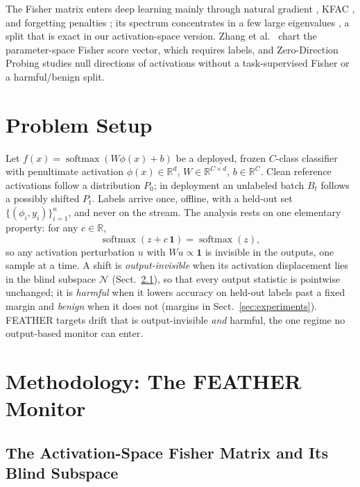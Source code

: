 \documentclass[graybox]{SNmult}
\newcommand{\R}{\mathbb{R}}
\newcommand{\act}{\phi}
\DeclareMathOperator*{\softmax}{softmax}
\begin{document}
The Fisher matrix enters deep learning mainly through natural gradient
\cite{amari1998natural}, KFAC \cite{martens2015kfac}, and forgetting penalties
\cite{kirkpatrick2017overcoming}; its spectrum concentrates in a few large
eigenvalues \cite{karakida2019universal}, a split that is exact in our
activation-space version. Zhang et al.\ \cite{zhang2023score} chart the
parameter-space Fisher score vector, which requires labels, and Zero-Direction
Probing \cite{pandey2025zdp} studies null directions of activations without a
task-supervised Fisher or a harmful/benign split.

\section{Problem Setup}
\label{sec:setup}

Let $f(x) = \softmax(W\act(x) + b)$ be a deployed, frozen $C$-class
classifier with penultimate activation $\act(x) \in \R^d$,
$W \in \R^{C \times d}$, $b \in \R^C$. Clean reference activations follow a
distribution $P_0$; in deployment an unlabeled batch $B_t$ follows a possibly
shifted $P_t$. Labels arrive once, offline, with a held-out set
$\{(\act_i, y_i)\}_{i=1}^{n}$, and never on the stream. The analysis rests on one
elementary property: for any $c \in \R$,
\begin{equation}
  \softmax(z + c\,\mathbf{1}) = \softmax(z),
  \label{eq:invariance}
\end{equation}
so any activation perturbation $u$ with $Wu \propto \mathbf{1}$ is invisible in
the outputs, one sample at a time. A shift is \emph{output-invisible} when its
activation displacement lies in the blind subspace $\mathcal{N}$
(Sect.~\ref{sec:blind}), so that every output statistic is pointwise
unchanged; it is \emph{harmful} when it lowers accuracy on held-out labels past
a fixed margin and \emph{benign} when it does not (margins in
Sect.~\ref{sec:experiments}). FEATHER targets drift that is output-invisible
\emph{and} harmful, the one regime no output-based monitor can enter.

\section{Methodology: The FEATHER Monitor}
\label{sec:method}

\subsection{The Activation-Space Fisher Matrix and Its Blind Subspace}
\label{sec:blind}
\end{document}
